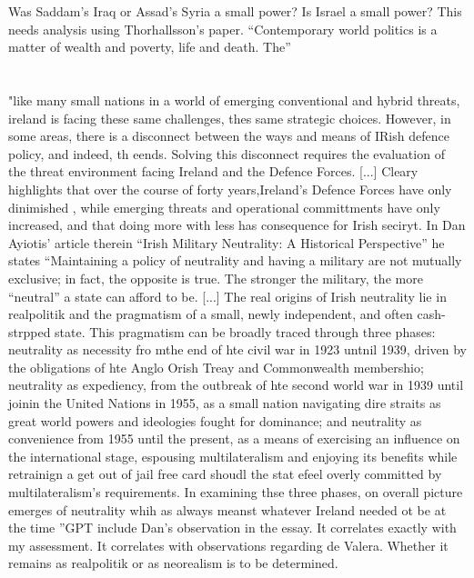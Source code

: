 Was Saddam's Iraq or Assad's Syria a small power? Is Israel a small power? This needs analysis using Thorhallsson's paper.  \parencite{KEOHANE_1988} ``Contemporary world politics is a matter of wealth and poverty, life and death. The''

\section{\parencite{CARROLL_2023}} "like many small nations in a world of emerging conventional and hybrid threats, ireland is facing these same challenges, thes same strategic choices. However, in some areas, there is a disconnect between the ways and means of IRish defence policy, and indeed, th eends. Solving this disconnect requires the evaluation of the threat environment facing Ireland and the Defence Forces. [...] Cleary highlights that over the course of forty years,Ireland's Defence Forces have only dinimished , while emerging threats and operational committments have only increased, and that doing more with less has consequence for Irish seciryt. In Dan Ayiotis' article therein ``Irish Military Neutrality: A Historical Perspective'' he states ``Maintaining a policy of neutrality and having a military are not mutually exclusive; in fact, the opposite is true. The stronger the military, the more ``neutral'' a state can afford to be. [...] The real origins of Irish neutrality lie in realpolitik and the pragmatism of a small, newly independent, and often cash-strpped state. This pragmatism can be broadly traced through three phases: neutrality as necessity fro mthe end of hte civil war in 1923 untnil 1939, driven by the obligations of hte Anglo Orish Treay and Commonwealth membershio; neutrality as expediency, from the outbreak of hte second world war in 1939 until joinin the United Nations in 1955, as a small nation navigating dire straits as great world powers and ideologies fought for dominance; and neutrality as convenience from 1955 until the present, as a means of exercising an influence on the international stage, espousing multilateralism and enjoying its benefits while retrainign a get out of jail free card shoudl the stat efeel overly committed by multilateralism's requirements. In examining thse three phases, on overall picture emerges of neutrality whih as always meanst whatever Ireland needed ot be at the time ''GPT include Dan's observation in the essay. It correlates exactly with my assessment. It correlates with observations regarding de Valera. Whether it remains as realpolitik or as neorealism is to be determined. 
 
